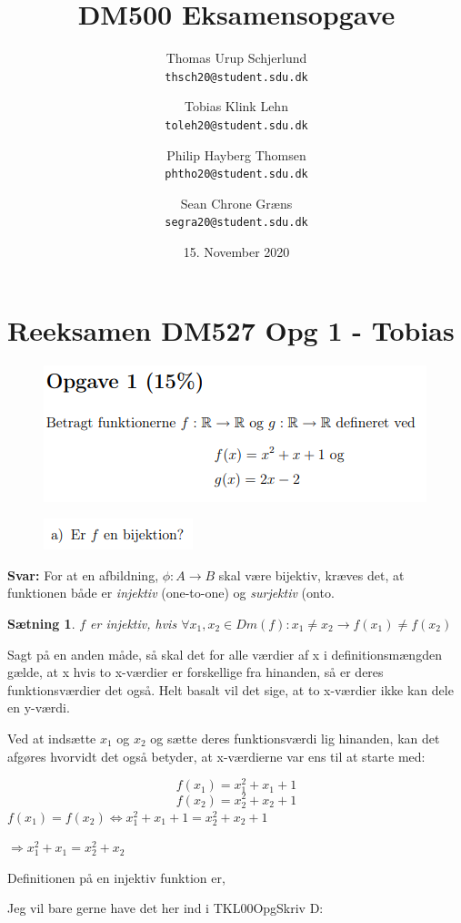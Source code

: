 \documentclass{article}
\title{DM500 Eksamensopgave}
\author{
	Thomas Urup Schjerlund\\
	\texttt{thsch20@student.sdu.dk}
	\and
	Tobias Klink Lehn\\
	\texttt{toleh20@student.sdu.dk}
	\and
	Philip Hayberg Thomsen\\
	\texttt{phtho20@student.sdu.dk}
	\and
	Sean Chrone Græns\\
	\texttt{segra20@student.sdu.dk}
}
\date{15. November 2020}
\newtheorem{theorem}{Sætning}
\begin{document}
\begin{titlepage}
\maketitle
\end{titlepage}

\section{Reeksamen DM527 Opg 1 - Tobias}
\begin{figure}[h]
\includegraphics[scale=1]{Opgave1Formulering}
\end{figure}

\begin{figure}[h]
\includegraphics[scale=1]{opga}
\end{figure}
\textbf{Svar:}
For at en afbildning, $\phi: A \rightarrow B$ skal være bijektiv, kræves det, at funktionen både er \emph{injektiv} (one-to-one) og \emph{surjektiv} (onto.

\begin{theorem}
$f$ er injektiv, hvis $\forall x_1, x_2 \in Dm(f): x_1 \neq x_2 \rightarrow f(x_1) \neq f(x_2)$
\end{theorem}

Sagt på en anden måde, så skal det for alle værdier af x i definitionsmængden gælde, at x hvis to x-værdier er forskellige fra hinanden, så er deres funktionsværdier det også. Helt basalt vil det sige, at to x-værdier ikke kan dele en y-værdi.

Ved at indsætte $x_1$ og $x_2$ og sætte deres funktionsværdi lig hinanden, kan det afgøres hvorvidt det også betyder, at x-værdierne var ens til at starte med:
\begin{center}
\[f(x_1) = x_1^2 + x_1 + 1 \] 
\[ f(x_2)=x_2^2 + x_2 + 1 \] 
\begin{math}
f(x_1) = f(x_2) \Leftrightarrow x^2_1 + x_1 + 1 = x^2_2 + x_2 + 1
\end{math} 
\par
\begin{math}
\Rightarrow x^2_1 + x_1 = x^2_2 + x_2
\end{math} 
\end{center}

Definitionen på en injektiv funktion er, 




Jeg vil bare gerne have det her ind i TKL00OpgSkriv D:
\end{document}
